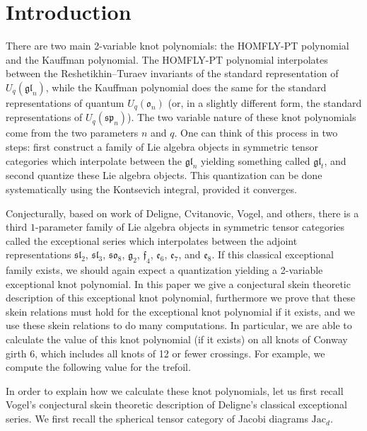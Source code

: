 \documentclass[12pt]{amsart}
\begin{document}
\section{Introduction}
\label{sec:introduction}

There are two main 2-variable knot polynomials: the HOMFLY-PT polynomial and the Kauffman polynomial.  The HOMFLY-PT polynomial interpolates between the Reshetikhin--Turaev invariants of the standard representation of $U_q(\mathfrak{gl}_n)$, while the Kauffman polynomial does the same for the standard representations of quantum $U_q(\mathfrak{o}_n)$ (or, in a slightly different form, the standard representations of $U_q(\mathfrak{sp}_n)$).  The two variable nature of these knot polynomials come from the two parameters $n$ and $q$.  One can think of this process in two steps: first construct a family of Lie algebra objects in symmetric tensor categories which interpolate between the $\mathfrak{gl}_n$ yielding something called $\mathfrak{gl}_t$, and second quantize these Lie algebra objects.   This quantization can be done systematically using the Kontsevich integral, provided it converges.

Conjecturally, based on work of Deligne, Cvitanovic, Vogel, and others, there is a third $1$-parameter family of Lie algebra objects in symmetric tensor categories called the exceptional series which interpolates between the adjoint representations $\mathfrak{sl}_2$, $\mathfrak{sl}_3$, $\mathfrak{so}_8$, $\mathfrak{g}_2$, $\mathfrak{f}_4$, $\mathfrak{e}_6$, $\mathfrak{e}_7$, and $\mathfrak{e}_8$.  If this classical exceptional family exists, we should again expect a quantization yielding a 2-variable exceptional knot polynomial.  In this paper we give a conjectural skein theoretic description of this exceptional knot polynomial, furthermore we prove that these skein relations must hold for the exceptional knot polynomial if it exists, and we use these skein relations to do many computations.  In particular, we are able to calculate the value of this knot polynomial (if it exists) on all knots of Conway girth 6, which includes all knots of 12 or fewer crossings.  For example, we compute the following value for the trefoil.


In order to explain how we calculate these knot polynomials, let us first recall Vogel's conjectural skein theoretic description of Deligne's classical exceptional series.  We first recall the spherical tensor category of Jacobi diagrams $\mathrm{Jac}_d$.  
\end{document}
